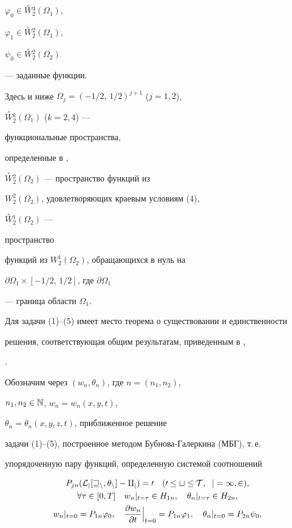 $\varphi_0\in\overset{\circ}{W}{}^4_2(\Omega_1)$,


$\varphi_1\in\overset{\circ}{W}{}^2_2(\Omega_1)$,


$\psi_0\in\overset{\circ}{W}{}^2_2(\Omega_2)$


--- заданные функции.


Здесь и ниже $\Omega_j=(-1/2,\,1/2)^{j+1}$ ($j=1,2$),


$\overset{\circ}{W}{}^k_2(\Omega_1)$ ($k=2,4$) ---


функциональные пространства,


определенные в \cite{Z3},


$\overset{\circ}{W}{}^2_2(\Omega_2)$ --- пространство функций из


$W^2_2(\Omega_2)$, удовлетворяющих краевым условиям (4),


$\overset{\circ}{W}{}^1_2(\Omega_2)$ ---


пространство


функций из $W^1_2(\Omega_2)$, обращающихся в нуль на


$\partial\Omega_1\times[-1/2,\,1/2]$, где $\partial\Omega_1$


--- граница области $\Omega_1$.


Для задачи (1)--(5) имеет место теорема о существовании и единственности


решения, соответствующая общим результатам, приведенным в \cite{Z3},


\cite{Z4}.





Обозначим через $(w_n,\theta_n)$, где $n=(n_1,n_2)$,


$n_1,n_2\in\Bbb N$, $w_n=w_n(x,y,t)$,


$\theta_n=\theta_n(x,y,z,t)$, приближенное решение


задачи (1)--(5), построенное методом Бубнова-Галеркина (МБГ), т.\,е.


упорядоченную пару функций, определенную системой соотношений


\begin{gather}




\allowdisplaybreaks


P_{jn}(\cal L_j[w_n,\theta_n]-q_j)=0\quad


(0\le t\le T, \ \; j=1,2),\\


\forall\tau\in[0,T]\quad w_n|_{t=\tau}\in H_{1n},\quad


\theta_n|_{t=\tau}\in H_{2n},\\


w_n|_{t=0}=P_{1n}\varphi_0,\quad


\Bigl.\frac{\partial w_n}{\partial t}\Bigr|_{t=0}=


P_{1n}\varphi_1,\quad \theta_n|_{t=0}=P_{2n}\psi_0,


\end{gather}


